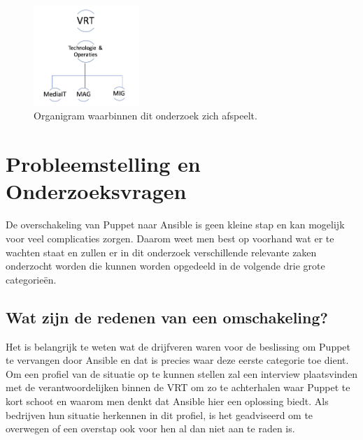 \begin{figure}
  \begin{center}
\includegraphics[width=150px]{img/organigram}
\end{center}  \caption{Organigram waarbinnen dit onderzoek zich afspeelt.}
  \label{fig:organigram}
\end{figure}







\section{Probleemstelling en Onderzoeksvragen}
\label{sec:onderzoeksvragen}




De overschakeling van Puppet naar Ansible is geen kleine stap en kan mogelijk voor veel complicaties zorgen. Daarom weet men best op voorhand wat er te wachten staat en zullen er in dit onderzoek verschillende relevante zaken onderzocht worden die kunnen worden opgedeeld in de volgende drie grote categorie\"en. 


\subsection{Wat zijn de redenen van een omschakeling?}

Het is belangrijk te weten wat de drijfveren waren voor de beslissing om Puppet te vervangen door Ansible en dat is precies waar deze eerste categorie toe dient. Om een profiel van de situatie op te kunnen stellen zal een interview plaatsvinden met de verantwoordelijken binnen de VRT om zo te achterhalen waar Puppet te kort schoot en waarom men denkt dat Ansible hier een oplossing biedt. Als bedrijven hun situatie herkennen in dit profiel, is het geadviseerd om te overwegen of een overstap ook voor hen al dan niet aan te raden is.

